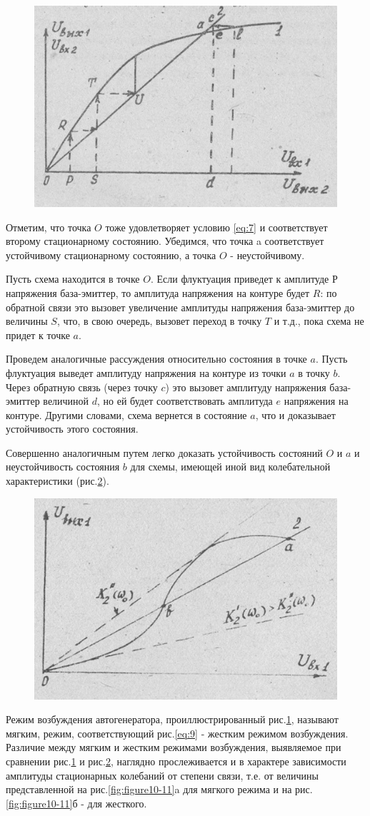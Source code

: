 \begin{figure}[h]
	\centering
	\includegraphics[width=0.4\linewidth]{circuit/8.jpg}
	\caption{}
	\label{fig:figure8}
\end{figure}

Отметим, что точка $O$ тоже удовлетворяет условию \eqref{eq:7} и соответствует второму стационарному состоянию. Убедимся, что точка a соответствует устойчивому стационарному состоянию, $а$ точка $O$ - неустойчивому.

Пусть схема находится в точке $O$. Если флуктуация приведет к амплитуде $Р$ напряжения база-эмиттер, то амплитуда напряжения на контуре будет $R$: по обратной связи это вызовет увеличение амплитуды напряжения база-эмиттер до величины $S$, что, в свою очередь, вызовет переход в точку $T$ и т.д., пока схема не придет к точке $a$.

Проведем аналогичные рассуждения относительно состояния в точке $a$. Пусть флуктуация выведет амплитуду напряжения на контуре из точки $a$ в точку $b$. Через обратную связь (через точку $c$) это вызовет амплитуду напряжения база-эмиттер величиной $d$, но ей будет соответствовать амплитуда $e$ напряжения на контуре. Другими словами, схема вернется в состояние $a$, что и доказывает устойчивость этого состояния.

Совершенно аналогичным путем легко доказать устойчивость состояний $O$ и $a$ и неустойчивость состояния $b$ для схемы, имеющей иной вид колебательной характеристики (рис.\ref{fig:figure9}).

\begin{figure}[h]
	\centering
	\includegraphics[width=0.4\linewidth]{circuit/9.jpg}
	\caption{}
	\label{fig:figure9}
\end{figure}

Режим возбуждения автогенератора, проиллюстрированный рис.\ref{fig:figure8}, называют мягким, режим, соответствующий рис.\ref{eq:9} - жестким режимом возбуждения. Различие между мягким и жестким режимами возбуждения, выявляемое при сравнении рис.\ref{fig:figure8} и рис.\ref{fig:figure9}, наглядно прослеживается и в характере зависимости амплитуды стационарных колебаний от степени связи, т.е. от величины представленной на рис.\ref{fig:figure10-11}a для мягкого режима и на рис.\ref{fig:figure10-11}б - для жесткого.

